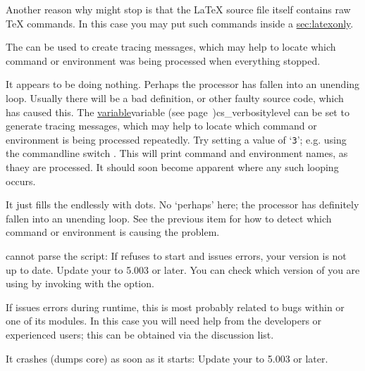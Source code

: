 \begin{htmllist}
Another reason why \latextohtml{} might stop is that the \LaTeX{} source
file itself contains raw \TeX{} commands. In this case you may
put such commands inside a 
\hyperref{environment}{environment (see Section }{)}{sec:latexonly}.

\begin{changebar}
The   can be used
to create tracing messages, which may help to locate which command
or environment was being processed when everything stopped.
\end{changebar}

\begin{changebar}
\item [It appears to be doing nothing.\label{looping}]
Perhaps the processor has fallen into an unending loop.
Usually there will be a bad definition, or other faulty source code,
which has caused this.
The  \hyperref[page]{variable}{variable (see page~}{)}{cs_verbositylevel}%
can be set to generate tracing messages, which may help to locate which command
or environment is being processed repeatedly.
Try setting a value of `\texttt{3}'; e.g. using the commandline switch .
This will print command and environment names, as thaey are processed.
It should soon become apparent where any such looping occurs.

\item [It just fills the endlessly with dots.]
No `perhaps' here; the processor has definitely fallen into an unending loop.
See the previous item for how to detect which command or environment
is causing the problem.
\end{changebar}

\begin{changebar}
%
\item [\Perl{} cannot parse the \fn{latex2html} script: ]
If \Perl{} refuses to start \latextohtml{} and issues errors, your
\Perl{} version is not up to date.
Update your \Perl{} to 5.003 or later. You can check which version of
\Perl{} you are using by invoking \Perl{} with the  option.

If \Perl{} issues errors during runtime, this is most probably related
to bugs within \latextohtml{} or one of its modules.
In this case you will need help from the developers or experienced users;
this can be obtained via the discussion list.


\item [It crashes (dumps core) as soon as it starts\label{perl}: ]
Update your \Perl{} to 5.003 or later.
\end{changebar}



\end{htmllist}
